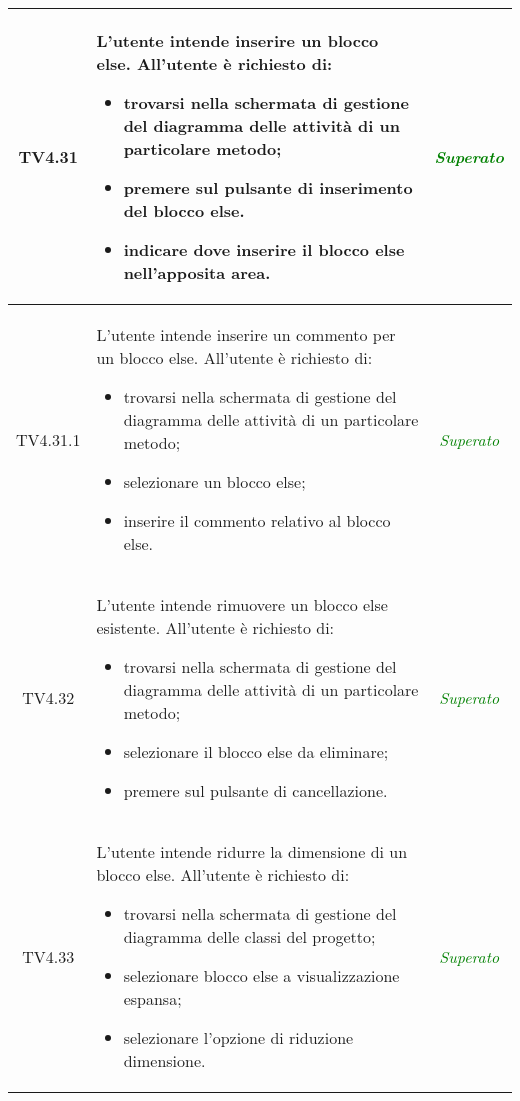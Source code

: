 \begin{longtable}{|c|>{}m{8cm}|c|}
\hypertarget{TV4.31}{TV4.31} & L'utente intende inserire un blocco else.
All'utente è richiesto di:
\begin{itemize}
	\item trovarsi nella schermata di gestione del diagramma delle attività di un particolare metodo;
	\item premere sul pulsante di inserimento del blocco else.
	\item indicare dove inserire il blocco else nell'apposita area.
\end{itemize} & \textcolor{Green}{\textit{Superato}}\\ \hline

\hypertarget{TV4.31.1}{TV4.31.1} & L'utente intende inserire un commento per un blocco else.
All'utente è richiesto di:
\begin{itemize}
	\item trovarsi nella schermata di gestione del diagramma delle attività di un particolare metodo;
	\item selezionare un blocco else;
	\item inserire il commento relativo al blocco else.
\end{itemize} & \textcolor{Green}{\textit{Superato}}\\ \hline

\hypertarget{TV4.32}{TV4.32} & L'utente intende rimuovere un blocco else esistente.
All'utente è richiesto di:
\begin{itemize}
	\item trovarsi nella schermata di gestione del diagramma delle attività di un particolare metodo;
	\item selezionare il blocco else da eliminare;
	\item premere sul pulsante di cancellazione.
\end{itemize} & \textcolor{Green}{\textit{Superato}}\\ \hline

\hypertarget{TV4.33}{TV4.33} & L'utente intende ridurre la dimensione di un blocco else.
All'utente è richiesto di:
\begin{itemize}
	\item trovarsi nella schermata di gestione del diagramma delle classi del progetto;
	\item selezionare blocco else a visualizzazione espansa;
	\item selezionare l'opzione di riduzione dimensione.
\end{itemize} & \textcolor{Green}{\textit{Superato}}\\ \hline


\end{longtable}
